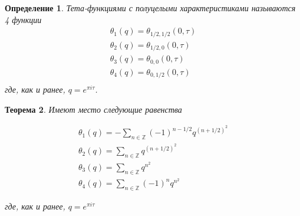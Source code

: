 \documentclass{article}
\newcommand{\ZZ}{\mathbb{Z}}
\theoremstyle{break}
\newtheorem{theorem}{Теорема}[section]
\newtheorem{definition}[theorem]{Определение}
\begin{document}
\begin{definition}
	Тета-функциями с полуцелыми характеристиками называются 4 функции
	\begin{equation}
		\begin{split}
			\theta_1(q)=\theta_{1/2, 1/2}(0, \tau) \\
			\theta_2(q)=\theta_{1/2, 0}(0, \tau) \\
			\theta_3(q)=\theta_{0, 0}(0, \tau) \\
			\theta_4(q)=\theta_{0, 1/2}(0, \tau) \\
		\end{split}
	\end{equation}
	где, как и ранее, $q=e^{\pi i \tau}$.
\end{definition}

\begin{theorem}
Имеют место следующие равенства

\begin{gather*}
	\theta_1(q)=-\sum_{n \in \ZZ} (-1)^{n-1/2}q^{(n+1/2)^2} \\ 
	\theta_2(q)=\sum_{n \in \ZZ} q^{(n+1/2)^2} \\
	\theta_3(q)=\sum_{n \in \ZZ} q^{n^2}	\\
	\theta_4(q)=\sum_{n \in \ZZ} {(-1)^n q^{n^2}}
\end{gather*}

где, как и ранее, $q=e^{\pi i \tau}$

\end{theorem}
\end{document}
